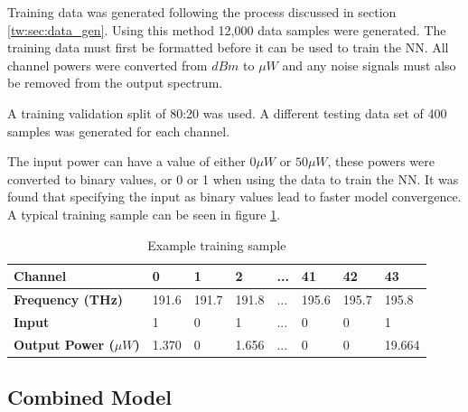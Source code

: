 

Training data was generated following the process discussed in section \ref{tw:sec:data_gen}. Using this method 12,000 data samples were generated. The training data must first be formatted before it can be used to train the NN. %
All channel powers were converted from $dBm$ to $\mu W$ and any noise signals must also be removed from the output spectrum. 

A training validation split of 80:20 was used. A different testing data set of 400 samples was generated for each channel. 

The input power can have a value of either $0\mu W$ or $50 \mu W$, these powers were converted to binary values, or 0 or 1 when using the data to train the NN. It was found that specifying the input as binary values lead to faster model convergence.
A typical training sample can be seen in figure \ref{tab:ex_data_sample}.


\renewcommand{\arraystretch}{1.15}
\begin{table}[!h] 
    \centering
    \caption{Example training sample}
    
    \begin{tabular}[t]{l l l l l l l l }
        \textbf{Channel} & 0 & 1 & 2 & ... & 41 & 42 & 43 \\
        \hline
        \textbf{Frequency (THz)} & 191.6 & 191.7 & 191.8 & ... & 195.6 & 195.7 & 195.8 \\
        \hline
        \textbf{Input} & 1 & 0 & 1 & ... & 0 & 0 &	1 \\
        \hline
        \textbf{Output Power ($\mu W$)} & 1.370 & 0 & 1.656 & ... & 0 &	0 &	19.664 \\
        \hline
    \end{tabular}
    \label{tab:ex_data_sample}
\end{table}

\FloatBarrier
\subsection{Combined Model} \label{sub:sec:comb_mod}

